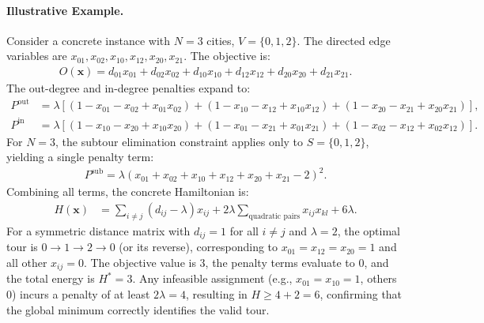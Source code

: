 \documentclass[12pt]{article}
\begin{document}
\paragraph{Illustrative Example.}
Consider a concrete instance with $N = 3$ cities, $V = \{0, 1, 2\}$. The directed edge variables are $x_{01}, x_{02}, x_{10}, x_{12}, x_{20}, x_{21}$. The objective is:
\begin{align}
    O(\mathbf{x}) = d_{01}x_{01} + d_{02}x_{02} + d_{10}x_{10} + d_{12}x_{12} + d_{20}x_{20} + d_{21}x_{21}.
\end{align}
The out-degree and in-degree penalties expand to:
\begin{align}
    P^{\text{out}} &= \lambda \left[ (1 - x_{01} - x_{02} + x_{01}x_{02}) + (1 - x_{10} - x_{12} + x_{10}x_{12}) + (1 - x_{20} - x_{21} + x_{20}x_{21}) \right], \\
    P^{\text{in}} &= \lambda \left[ (1 - x_{10} - x_{20} + x_{10}x_{20}) + (1 - x_{01} - x_{21} + x_{01}x_{21}) + (1 - x_{02} - x_{12} + x_{02}x_{12}) \right].
\end{align}
For $N=3$, the subtour elimination constraint applies only to $S=\{0,1,2\}$, yielding a single penalty term:
\begin{align}
    P^{\text{sub}} = \lambda \left( x_{01} + x_{02} + x_{10} + x_{12} + x_{20} + x_{21} - 2 \right)^2.
\end{align}
Combining all terms, the concrete Hamiltonian is:
\begin{align}
    H(\mathbf{x}) &= \sum_{i \neq j} (d_{ij} - \lambda) x_{ij} + 2\lambda \sum_{\text{quadratic pairs}} x_{ij}x_{kl} + 6\lambda.
\end{align}
For a symmetric distance matrix with $d_{ij} = 1$ for all $i \neq j$ and $\lambda = 2$, the optimal tour is $0 \to 1 \to 2 \to 0$ (or its reverse), corresponding to $x_{01}=x_{12}=x_{20}=1$ and all other $x_{ij}=0$. The objective value is $3$, the penalty terms evaluate to $0$, and the total energy is $H^* = 3$. Any infeasible assignment (e.g., $x_{01}=x_{10}=1$, others $0$) incurs a penalty of at least $2\lambda = 4$, resulting in $H \ge 4 + 2 = 6$, confirming that the global minimum correctly identifies the valid tour.
\end{document}
